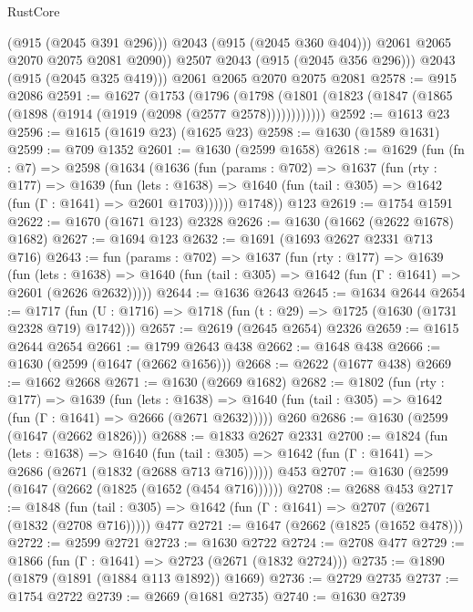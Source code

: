 \begin{lexlean}{RustCore}
\begin{coremodule}
                (@915 (@2045 @391 @296)))
              @2043
              (@915 (@2045 @360 @404)))
            @2061
            @2065
            @2070
            @2075
            @2081
            @2090))
        @2507
        @2043
        (@915 (@2045 @356 @296)))
      @2043
      (@915 (@2045 @325 @419)))
    @2061
    @2065
    @2070
    @2075
    @2081
@2578 := @915 @2086
@2591 := @1627
    (@1753
      (@1796 (@1798 (@1801 (@1823 (@1847 (@1865 (@1898 (@1914 (@1919 (@2098 (@2577 @2578))))))))))))
@2592 := @1613 @23
@2596 := @1615 (@1619 @23) (@1625 @23)
@2598 := @1630 (@1589 @1631)
@2599 := @709 @1352
@2601 := @1630 (@2599 @1658)
@2618 := @1629
    (fun (fn : @7) =>
    @2598
      (@1634
        (@1636
          (fun (params : @702) =>
          @1637
            (fun (rty : @177) =>
            @1639
              (fun (lets : @1638) =>
              @1640 (fun (tail : @305) => @1642 (fun (Γ : @1641) => @2601 @1703))))))
        @1748))
    @123
@2619 := @1754 @1591
@2622 := @1670 (@1671 @123) @2328
@2626 := @1630 (@1662 (@2622 @1678) @1682)
@2627 := @1694 @123
@2632 := @1691 (@1693 @2627 @2331 @713 @716)
@2643 := fun (params : @702) =>
  @1637
    (fun (rty : @177) =>
    @1639
      (fun (lets : @1638) =>
      @1640 (fun (tail : @305) => @1642 (fun (Γ : @1641) => @2601 (@2626 @2632)))))
@2644 := @1636 @2643
@2645 := @1634 @2644
@2654 := @1717 (fun (U : @1716) => @1718 (fun (t : @29) => @1725 (@1630 (@1731 @2328 @719) @1742)))
@2657 := @2619 (@2645 @2654) @2326
@2659 := @1615 @2644 @2654
@2661 := @1799 @2643 @438
@2662 := @1648 @438
@2666 := @1630 (@2599 (@1647 (@2662 @1656)))
@2668 := @2622 (@1677 @438)
@2669 := @1662 @2668
@2671 := @1630 (@2669 @1682)
@2682 := @1802
    (fun (rty : @177) =>
    @1639
      (fun (lets : @1638) =>
      @1640 (fun (tail : @305) => @1642 (fun (Γ : @1641) => @2666 (@2671 @2632)))))
    @260
@2686 := @1630 (@2599 (@1647 (@2662 @1826)))
@2688 := @1833 @2627 @2331
@2700 := @1824
    (fun (lets : @1638) =>
    @1640 (fun (tail : @305) => @1642 (fun (Γ : @1641) => @2686 (@2671 (@1832 (@2688 @713 @716))))))
    @453
@2707 := @1630 (@2599 (@1647 (@2662 (@1825 (@1652 (@454 @716))))))
@2708 := @2688 @453
@2717 := @1848
    (fun (tail : @305) => @1642 (fun (Γ : @1641) => @2707 (@2671 (@1832 (@2708 @716)))))
    @477
@2721 := @1647 (@2662 (@1825 (@1652 @478)))
@2722 := @2599 @2721
@2723 := @1630 @2722
@2724 := @2708 @477
@2729 := @1866 (fun (Γ : @1641) => @2723 (@2671 (@1832 @2724)))
@2735 := @1890 (@1879 (@1891 (@1884 @113 @1892)) @1669)
@2736 := @2729 @2735
@2737 := @1754 @2722
@2739 := @2669 (@1681 @2735)
@2740 := @1630 @2739

\end{coremodule}
\end{lexlean}
